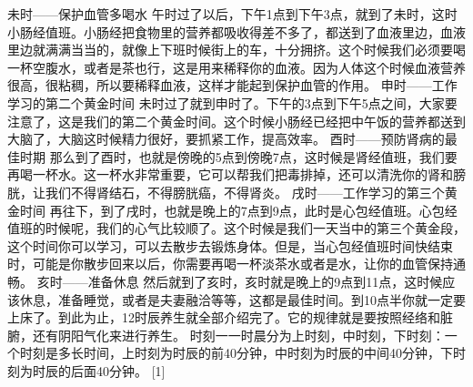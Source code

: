 未时——保护血管多喝水
午时过了以后，下午1点到下午3点，就到了未时，这时小肠经值班。小肠经把食物里的营养都吸收得差不多了，都送到了血液里边，血液里边就满满当当的，就像上下班时候街上的车，十分拥挤。这个时候我们必须要喝一杯空腹水，或者是茶也行，这是用来稀释你的血液。因为人体这个时候血液营养很高，很粘稠，所以要稀释血液，这样才能起到保护血管的作用。
申时——工作学习的第二个黄金时间
未时过了就到申时了。下午的3点到下午5点之间，大家要注意了，这是我们的第二个黄金时间。这个时候小肠经已经把中午饭的营养都送到大脑了，大脑这时候精力很好，要抓紧工作，提高效率。
酉时——预防肾病的最佳时期
那么到了酉时，也就是傍晚的5点到傍晚7点，这时候是肾经值班，我们要再喝一杯水。这一杯水非常重要，它可以帮我们把毒排掉，还可以清洗你的肾和膀胱，让我们不得肾结石，不得膀胱癌，不得肾炎。
戌时——工作学习的第三个黄金时间
再往下，到了戌时，也就是晚上的7点到9点，此时是心包经值班。心包经值班的时候呢，我们的心气比较顺了。这个时候是我们一天当中的第三个黄金段，这个时间你可以学习，可以去散步去锻炼身体。但是，当心包经值班时间快结束时，可能是你散步回来以后，你需要再喝一杯淡茶水或者是水，让你的血管保持通畅。
亥时——准备休息
然后就到了亥时，亥时就是晚上的9点到11点，这时候应该休息，准备睡觉，或者是夫妻融洽等等，这都是最佳时间。到10点半你就一定要上床了。到此为止，12时辰养生就全部介绍完了。它的规律就是要按照经络和脏腑，还有阴阳气化来进行养生。
时刻一一时晨分为上时刻，中时刻，下时刻：一个时刻是多长时间，上时刻为时辰的前40分钟，中时刻为时辰的中间40分钟，下时刻为时辰的后面40分钟。 [1] 